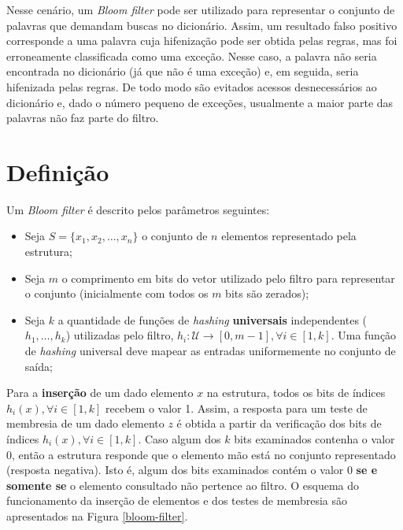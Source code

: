 \documentclass[12pt,twoside,english,brazilian]{book}
\begin{document}
Nesse cenário, um \textit{Bloom filter} pode ser utilizado para representar o conjunto de palavras que demandam buscas no dicionário. Assim, um resultado falso positivo corresponde a uma palavra cuja hifenização pode ser obtida pelas regras, mas foi erroneamente classificada como uma exceção. Nesse caso, a palavra não seria encontrada no dicionário (já que não é uma exceção) e, em seguida, seria hifenizada pelas regras. De todo modo são evitados acessos desnecessários ao dicionário e, dado o número pequeno de exceções, usualmente a maior parte das palavras não faz parte do filtro.

\section{Definição}

Um \textit{Bloom filter} é descrito pelos parâmetros seguintes:

\begin{itemize}
    \item Seja $S = \{ x_1, x_2, \dots, x_n \}$ o conjunto de $n$ elementos representado pela estrutura;
    \item Seja $m$ o comprimento em bits do vetor utilizado pelo filtro para representar o conjunto (inicialmente com todos os $m$ bits são zerados);
    \item Seja $k$ a quantidade de funções de \textit{hashing} \textbf{universais} independentes ($h_1, \dots, h_k$) utilizadas pelo filtro, $h_i: \mathcal{U} \to [0, m-1], \forall i \in [1, k]$. Uma função de \textit{hashing} universal deve mapear as entradas uniformemente no conjunto de saída;
\end{itemize}

Para a \textbf{inserção} de um dado elemento $x$ na estrutura, todos os bits de índices $h_i(x), \forall i \in [1,k]$ recebem o valor 1. Assim, a resposta para um teste de membresia de um dado elemento $z$ é obtida a partir da verificação dos bits de índices $h_i(x), \forall i \in [1,k]$. Caso algum dos $k$ bits examinados contenha o valor 0, então a estrutura responde que o elemento mão está no conjunto representado (resposta negativa). Isto é, algum dos bits examinados contém o valor 0 \textbf{se e somente se} o elemento consultado não pertence ao filtro. O esquema do funcionamento da inserção de elementos e dos testes de membresia são apresentados na Figura \ref{bloom-filter}.
\end{document}
